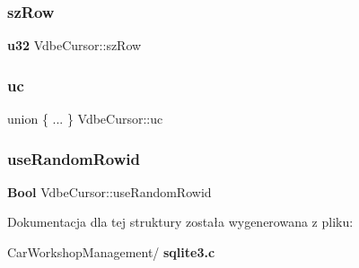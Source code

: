 \mbox{\label{struct_vdbe_cursor_ac0fa6de4df7f418dfd5307cb892ba455}} 
\subsubsection{szRow}
{\footnotesize\ttfamily \textbf{ u32} Vdbe\+Cursor\+::sz\+Row}

\mbox{\label{struct_vdbe_cursor_a1c17c0f013d4e564a7ee567691f1cc56}} 
\subsubsection{uc}
{\footnotesize\ttfamily union \{ ... \}   Vdbe\+Cursor\+::uc}

\mbox{\label{struct_vdbe_cursor_a067fff911d6d37190785a0cf5ba4fc8e}} 
\subsubsection{useRandomRowid}
{\footnotesize\ttfamily \textbf{ Bool} Vdbe\+Cursor\+::use\+Random\+Rowid}



Dokumentacja dla tej struktury została wygenerowana z pliku\+:\begin{DoxyCompactItemize}
\item 
Car\+Workshop\+Management/\textbf{ sqlite3.\+c}\end{DoxyCompactItemize}
